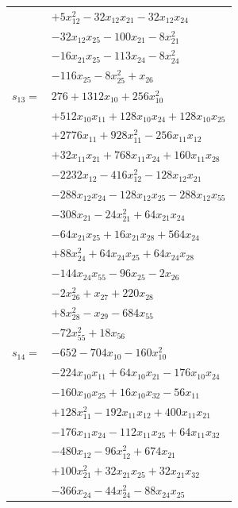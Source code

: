 \begin{longtable}{@{}r@{\;}l@{}}
 & \(\displaystyle +5x_{12}^{2} -32x_{12}x_{21} -32x_{12}x_{24}\) \\
 & \(\displaystyle -32x_{12}x_{25} -100x_{21} -8x_{21}^{2}\) \\
 & \(\displaystyle -16x_{21}x_{25} -113x_{24} -8x_{24}^{2}\) \\
 & \(\displaystyle -116x_{25} -8x_{25}^{2} +x_{26}\) \\[3pt]
\(s_{13}=\) & \(\displaystyle 276 +1312x_{10} +256x_{10}^{2}\) \\
 & \(\displaystyle +512x_{10}x_{11} +128x_{10}x_{24} +128x_{10}x_{25}\) \\
 & \(\displaystyle +2776x_{11} +928x_{11}^{2} -256x_{11}x_{12}\) \\
 & \(\displaystyle +32x_{11}x_{21} +768x_{11}x_{24} +160x_{11}x_{28}\) \\
 & \(\displaystyle -2232x_{12} -416x_{12}^{2} -128x_{12}x_{21}\) \\
 & \(\displaystyle -288x_{12}x_{24} -128x_{12}x_{25} -288x_{12}x_{55}\) \\
 & \(\displaystyle -308x_{21} -24x_{21}^{2} +64x_{21}x_{24}\) \\
 & \(\displaystyle -64x_{21}x_{25} +16x_{21}x_{28} +564x_{24}\) \\
 & \(\displaystyle +88x_{24}^{2} +64x_{24}x_{25} +64x_{24}x_{28}\) \\
 & \(\displaystyle -144x_{24}x_{55} -96x_{25} -2x_{26}\) \\
 & \(\displaystyle -2x_{26}^{2} +x_{27} +220x_{28}\) \\
 & \(\displaystyle +8x_{28}^{2} -x_{29} -684x_{55}\) \\
 & \(\displaystyle -72x_{55}^{2} +18x_{56}\) \\[3pt]
\(s_{14}=\) & \(\displaystyle -652 -704x_{10} -160x_{10}^{2}\) \\
 & \(\displaystyle -224x_{10}x_{11} +64x_{10}x_{21} -176x_{10}x_{24}\) \\
 & \(\displaystyle -160x_{10}x_{25} +16x_{10}x_{32} -56x_{11}\) \\
 & \(\displaystyle +128x_{11}^{2} -192x_{11}x_{12} +400x_{11}x_{21}\) \\
 & \(\displaystyle -176x_{11}x_{24} -112x_{11}x_{25} +64x_{11}x_{32}\) \\
 & \(\displaystyle -480x_{12} -96x_{12}^{2} +674x_{21}\) \\
 & \(\displaystyle +100x_{21}^{2} +32x_{21}x_{25} +32x_{21}x_{32}\) \\
 & \(\displaystyle -366x_{24} -44x_{24}^{2} -88x_{24}x_{25}\) \\

\end{longtable}

